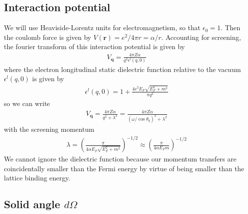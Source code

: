 \documentclass{article}
\begin{document}
\subsection{Interaction potential}

We will use Heaviside-Lorentz units for electromagnetism, so that $\epsilon_0 = 1$. Then the coulomb force is given by $V(\textbf{r}) = e^2 / 4 \pi r = \alpha / r$. Accounting for screening, the fourier transform of this interaction potential is given by \cite{french}
\begin{align}
V_\textbf{q} = \frac{4 \pi Z\alpha}{q^2 \epsilon^l(q, 0)}
\end{align}
where the electron longitudinal static dielectric function relative to the vacuum $\epsilon^l(q, 0)$ is given by
\begin{align}
\epsilon^l(q, 0) = 1 + \frac{4 e^2 E_F \sqrt{E_F^2 + m^2}}{\pi q^2}
\end{align}
so we can write
\begin{align}
V_\textbf{q} = \frac{4 \pi Z\alpha}{q^2 + \lambda^2} = \frac{4 \pi Z\alpha}{(\omega / \cos\theta_q)^2+ \lambda^2}
\label{eq:ScreenedInteractionPotential}
\end{align}
with the screening momentum
\begin{align}
\lambda = \left( \frac{\pi}{4 \alpha E_F \sqrt{E_F^2 + m^2}} \right)^{-1/2} \approx \left( \frac{\pi}{4 \alpha E_F m} \right)^{-1/2}
\end{align}
We cannot ignore the dielectric function because our momentum transfers are coincidentally smaller than the Fermi energy by virtue of being smaller than the lattice binding energy.

\subsection{Solid angle $d \Omega$}
\label{sec:SolidAngle}
\end{document}
